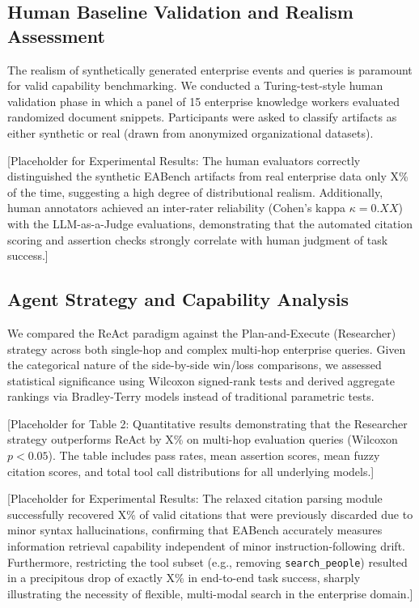 \documentclass[journal,dvipsnames]{acmart}
\begin{document}
\subsection{Human Baseline Validation and Realism Assessment}
The realism of synthetically generated enterprise events and queries is paramount for valid capability benchmarking. We conducted a Turing-test-style human validation phase in which a panel of 15 enterprise knowledge workers evaluated randomized document snippets. Participants were asked to classify artifacts as either synthetic or real (drawn from anonymized organizational datasets). 

[Placeholder for Experimental Results: The human evaluators correctly distinguished the synthetic EABench artifacts from real enterprise data only X\% of the time, suggesting a high degree of distributional realism. Additionally, human annotators achieved an inter-rater reliability (Cohen's kappa $\kappa = 0.XX$) with the LLM-as-a-Judge evaluations, demonstrating that the automated citation scoring and assertion checks strongly correlate with human judgment of task success.]

\subsection{Agent Strategy and Capability Analysis}
We compared the ReAct paradigm against the Plan-and-Execute (Researcher) strategy across both single-hop and complex multi-hop enterprise queries. Given the categorical nature of the side-by-side win/loss comparisons, we assessed statistical significance using Wilcoxon signed-rank tests and derived aggregate rankings via Bradley-Terry models instead of traditional parametric tests.

[Placeholder for Table 2: Quantitative results demonstrating that the Researcher strategy outperforms ReAct by X\% on multi-hop evaluation queries (Wilcoxon $p < 0.05$). The table includes pass rates, mean assertion scores, mean fuzzy citation scores, and total tool call distributions for all underlying models.]

[Placeholder for Experimental Results: The relaxed citation parsing module successfully recovered X\% of valid citations that were previously discarded due to minor syntax hallucinations, confirming that EABench accurately measures information retrieval capability independent of minor instruction-following drift. Furthermore, restricting the tool subset (e.g., removing \texttt{search\_people}) resulted in a precipitous drop of exactly X\% in end-to-end task success, sharply illustrating the necessity of flexible, multi-modal search in the enterprise domain.]
\end{document}
